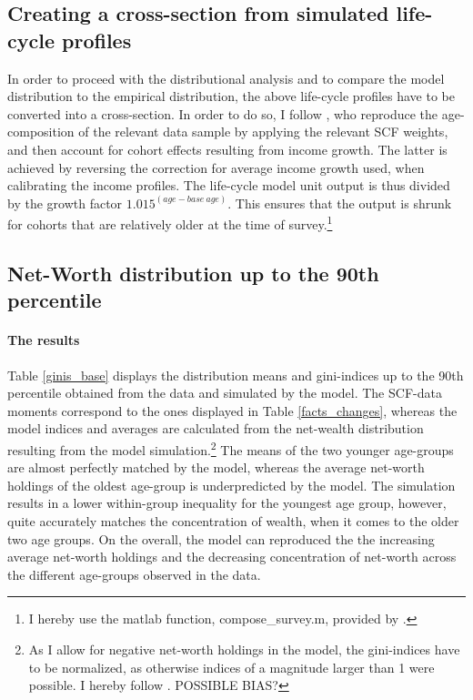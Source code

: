 \documentclass[12pt,a4paper,leqno]{article}
\theoremstyle{definition}
\begin{document}
\subsection{Creating a cross-section from simulated life-cycle profiles}
In order to proceed with the distributional analysis and to compare the model distribution to the empirical distribution, the above life-cycle profiles have to be converted into a cross-section. In order to do so, I follow \cite{hintermaier2011}, who reproduce the age-composition of the relevant data sample by applying the relevant SCF weights, and then account for cohort effects resulting from income growth. The latter is achieved by reversing the correction for average income growth used, when calibrating the income profiles. The life-cycle model unit output is thus divided by the growth factor $1.015^{(age-base\ age)}$. This ensures that the output is shrunk for cohorts that are relatively older at the time of survey.\footnote{I hereby use the matlab function, compose\_survey.m, provided by \cite{hintermaier2016}.}

\subsection{Net-Worth distribution up to the 90th percentile}

\paragraph{The results}
Table \ref{ginis_base} displays the distribution means and gini-indices up to the 90th percentile obtained from the data and simulated by the model. The SCF-data moments correspond to the ones displayed in Table \ref{facts_changes}, whereas the model indices and averages are calculated from the net-wealth distribution resulting from the model simulation.\footnote{As I allow for negative net-worth holdings in the model, the gini-indices have to be normalized, as otherwise indices of a magnitude larger than 1 were possible. I hereby follow \cite{chen1982}. POSSIBLE BIAS?} The means of the two younger age-groups are almost perfectly matched by the model, whereas the average net-worth holdings of the oldest age-group is underpredicted by the model. The simulation results in a lower within-group inequality for the youngest age group, however, quite accurately matches the concentration of wealth, when it comes to the older two age groups. On the overall, the model can reproduced the the increasing average net-worth holdings and the decreasing concentration of net-worth across the different age-groups observed in the data. 
\end{document}
